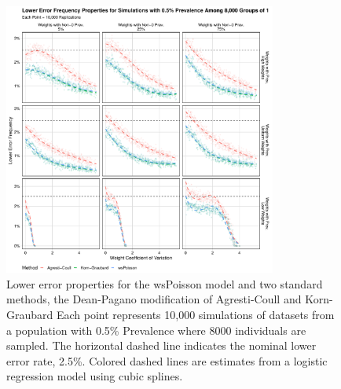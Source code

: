 \documentclass[AMA,STIX1COL]{WileyNJD-v2}
\begin{document}
\begin{figure}
\centering
\includegraphics[width=0.8\textwidth]{figures/perfect_lower_error_frequency_8000_groups_0_005_prev.pdf}
\caption{Lower error properties for the wsPoisson model and two standard methods, the Dean-Pagano modification of Agresti-Coull and Korn-Graubard
Each point represents 10,000 simulations of datasets from a population with 0.5\% Prevalence where 8000 individuals are sampled.
The horizontal dashed line indicates the nominal lower error rate, 2.5\%.
Colored dashed lines are estimates from a logistic regression model using cubic splines.}
\label{fig:perfect_lower_error_frequency_8000_groups_0_005_prev}
\end{figure}
\end{document}

